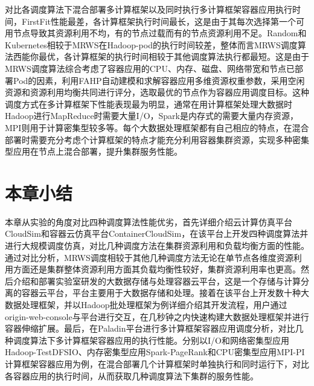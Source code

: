 对比各调度算法下混合部署多计算框架以及同时执行多计算框架容器应用执行时间，FirstFit性能最差，各计算框架执行时间最长，这是由于其每次选择第一个可用节点导致其资源利用不均，有的节点过载而有的节点资源利用不足。Random和Kubernetes相较于MRWS在Hadoop-pod的执行时间较差，整体而言MRWS调度算法西能你最优，各计算框架的执行时间相较于其他调度算法执行都最短。这是由于MRWS调度算法综合考虑了容器应用的CPU、内存、磁盘、网络带宽和节点已部署Pod的因素，利用FAHP自动建模和求解容器应用多维资源权重参数，采用空闲资源和资源利用均衡共同进行评分，选取最优的节点作为容器应用调度目标。这种调度方式在多计算框架下性能表现最为明显，通常在用计算框架处理大数据时Hadoop进行MapReduce时需要大量I/O，Spark是内存式的需要大量内存资源，MPI则用于计算密集型较多等。每个大数据处理框架都有自己相应的特点，在混合部署时需要充分考虑个计算框架的特点才能充分利用容器集群资源，实现多种密集型应用在节点上混合部署，提升集群服务性能。

\section{本章小结}
本章从实验的角度对比四种调度算法性能优劣，首先详细介绍云计算仿真平台CloudSim和容器云仿真平台ContainerCloudSim，在该平台上开发四种调度算法并进行大规模调度仿真，对比几种调度方法在集群资源利用和负载均衡方面的性能。通过对比分析，MRWS调度相较于其他几种调度方法无论在单节点各维度资源利用方面还是集群整体资源利用方面其负载均衡性较好，集群资源利用率也更高。然后介绍和部署实验室研发的大数据存储与处理容器云平台，这是一个存储与计算分离的容器云平台，平台主要用于大数据存储和处理。接着在该平台上开发数十种大数据处理框架，并以Hadoop批处理框架为例详细介绍其开发流程，用户通过origin-web-console与平台进行交互，在几秒钟之内快速构建大数据处理框架并进行容器伸缩扩展。最后，在Paladin平台进行多计算框架容器应用调度分析，对比几种调度算法下多计算框架容器应用的执行性能。分别以I/O和网络密集型应用Hadoop-TestDFSIO、内存密集型应用Spark-PageRank和CPU密集型应用MPI-PI计算框架容器应用为例，在混合部署几个计算框架时单独执行和同时运行下，对比各容器应用的执行时间，从而获取几种调度算法下集群的服务性能。



















